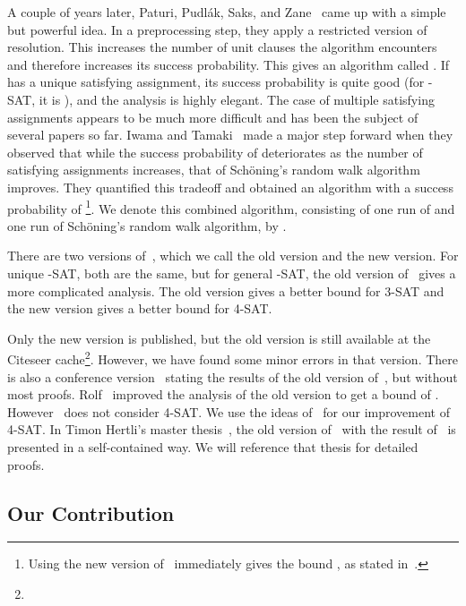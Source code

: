 A couple of years later, Paturi, Pudl\'ak, Saks, and Zane~\cite{ppsz}
came up with a simple but powerful idea. In a preprocessing step, they
apply a restricted version of resolution. This increases the number of
unit clauses the algorithm encounters and therefore increases its
success probability.
This gives an algorithm called .  If  has a unique
satisfying assignment, its success probability is quite good (for
-SAT, it is ), and the analysis is highly
elegant. The case of multiple satisfying assignments appears to be
much more difficult and has been the subject of several papers so far.
Iwama and Tamaki~\cite{it04} made a major step forward when they
observed that while the success probability of  deteriorates as
the number of satisfying assignments increases, that of Sch\"oning's
random walk algorithm~\cite{schoning1999} improves.  They quantified
this tradeoff and obtained an algorithm with a success probability of
\footnote{Using the new version of~\cite{ppsz} immediately gives the bound , as stated in~\cite{rolf2006}.}. We denote this combined algorithm, consisting of one run
of  and one run of Sch\"oning's random walk algorithm, by .\paragraphprev


There are two versions of~\cite{ppsz}, which we call the old version
and the new version. For unique -SAT, both are the same, but for general
-SAT, the old version of~\cite{ppsz} gives a more complicated
analysis. The old version gives a better bound for 3-SAT and the new version gives a better bound for 4-SAT\@.

Only the new version is published, but the old version is still
available at the Citeseer cache\footnote{}.
However, we have found some minor errors in that version.  There is also a
conference version~\cite{ppszconference} stating the results of the old
version of~\cite{ppsz}, but without most proofs. 
Rolf~\cite{rolf2006} improved the analysis of the old version to get a bound of . However~\cite{rolf2006} does not consider 4-SAT\@. We use the ideas of~\cite{rolf2006} for our improvement
of 4-SAT\@.
In Timon Hertli's
master thesis~\cite{thesis}, the old version of~\cite{ppsz} with the
result of~\cite{rolf2006} is presented in a self-contained way. We will reference that thesis for detailed proofs.


\subsection{Our Contribution}

